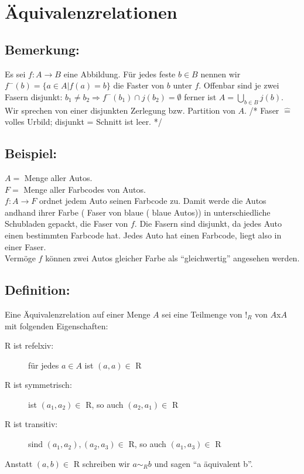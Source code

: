 \section{Äquivalenzrelationen}

\subsection{Bemerkung:}
	Es sei $f: A \rightarrow B$ eine Abbildung. Für jedes feste $b \in B$ nennen wir $f^{-}(b) = \{ a \in A | f(a) = b\}$ die Faster von $b$ unter $f$. Offenbar sind je zwei Fasern disjunkt: $b_{1} \neq b_{2} \Longrightarrow f^{-} (b_{1}) \cap j(b_{2}) = \emptyset$ ferner ist $ A =  	\bigcup_{b \in B} j(b)$. Wir sprechen von einer disjunkten Zerlegung bzw. Partition von $A$. /*  Faser $\mathrel{\widehat{=}}$ volles Urbild; disjunkt = Schnitt ist leer. */ 

\subsection{Beispiel:}
	$ A =$ Menge aller Autos. \\
	$ F =$ Menge aller Farbcodes von Autos.\\
	$f: A \rightarrow F$ ordnet jedem Auto seinen Farbcode zu. Damit werde die Autos andhand ihrer Farbe ( Faser von blaue ( blaue Autos)) in unterschiedliche Schubladen gepackt, die Faser von $f$. Die Fasern sind disjunkt, da jedes Auto einen bestimmten Farbcode hat. Jedes Auto hat einen Farbcode, liegt also in einer Faser. \\
Vermöge $f$ können zwei Autos gleicher Farbe als "`gleichwertig"' angesehen werden. 

\subsection{Definition:}
Eine Äquivalenzrelation auf einer Menge $A$ sei eine Teilmenge von $!_{R}$ von $A$x$A$ mit folgenden Eigenschaften:
\begin{description}

	\item[R ist refelxiv:] für jedes $a \in A$ ist $(a,a) \in $ R
	\item[R ist symmetrisch:] ist $(a_{1}, a_{2}) \in $ R, so auch $(a_{2},a_{1}) \in$ R
	\item[R ist transitiv:] sind $(a_{1}, a_{2}),(a_{2}, a_{3}) \in$ R, so auch $(a_{1},a_{3}) \in$ R

\end{description}
Anstatt $(a,b) \in$ R schreiben wir $a \sim_{R} b$ und sagen "`a äquivalent b"'.

